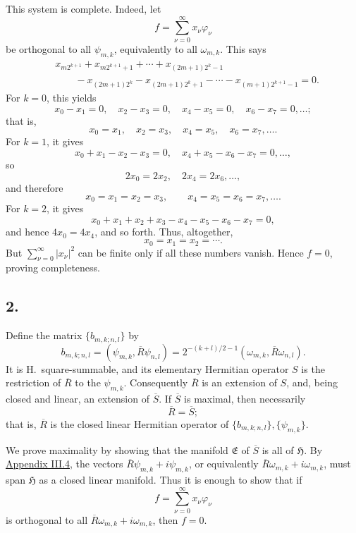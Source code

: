 ﻿\documentclass[paper=b5,fontsize=13pt,bookmarkpackage=false,twoside]{scrartcl}
\begin{document}
This system is complete.  Indeed, let
\[
  f=\sum_{\nu=0}^{\infty}x_\nu\varphi_\nu
\]
be orthogonal to all \(\psi_{m,k}\), equivalently to all
\(\omega_{m,k}\).  This says
\begin{align*}
 &x_{m2^{k+1}}+x_{m2^{k+1}+1}+\cdots
  +x_{(2m+1)2^k-1}\\
 &\qquad
 -x_{(2m+1)2^k}-x_{(2m+1)2^k+1}-\cdots
 -x_{(m+1)2^{k+1}-1}=0.
\end{align*}
For \(k=0\), this yields
\[
  x_0-x_1=0,\quad x_2-x_3=0,\quad
  x_4-x_5=0,\quad x_6-x_7=0,\ldots;
\]
that is,
\[
  x_0=x_1,\quad x_2=x_3,\quad
  x_4=x_5,\quad x_6=x_7,\ldots.
\]
For \(k=1\), it gives
\[
  x_0+x_1-x_2-x_3=0,\quad
  x_4+x_5-x_6-x_7=0,\ldots,
\]
so
\[
  2x_0=2x_2,\quad2x_4=2x_6,\ldots,
\]
and therefore
\[
  x_0=x_1=x_2=x_3,\qquad
  x_4=x_5=x_6=x_7,\ldots.
\]
For \(k=2\), it gives
\[
  x_0+x_1+x_2+x_3-x_4-x_5-x_6-x_7=0,
\]
and hence \(4x_0=4x_4\), and so forth.  Thus, altogether,
\[
  x_0=x_1=x_2=\cdots.
\]
But \(\sum_{\nu=0}^{\infty}|x_\nu|^2\) can be finite only if all these
numbers vanish.  Hence \(f=0\), proving completeness.

\subsection*{2.}
\label{appIV:2}

Define the matrix \(\{b_{m,k;n,l}\}\) by
\[
  b_{m,k;n,l}
  =(\psi_{m,k},\overline R\psi_{n,l})
  =2^{-(k+l)/2-1}(\omega_{m,k},\overline R\omega_{n,l}).
\]
It is H.\ square-summable, and its elementary Hermitian operator \(S\)
is the restriction of \(\overline R\) to the \(\psi_{m,k}\).
Consequently \(\overline R\) is an extension of \(S\), and, being
closed and linear, an extension of \(\overline S\).  If \(\overline S\)
is maximal, then necessarily
\[
  \overline R=\overline S;
\]
that is, \(\overline R\) is the closed linear Hermitian operator of
\(\{b_{m,k;n,l}\},\{\psi_{m,k}\}\).

We prove maximality by showing that the manifold \(\mathfrak E\) of
\(\overline S\) is all of \(\mathfrak H\).  By
\hyperref[appIII:4]{Appendix III.4}, the vectors
\(\overline R\psi_{m,k}+i\psi_{m,k}\), or equivalently
\(\overline R\omega_{m,k}+i\omega_{m,k}\), must span
\(\mathfrak H\) as a closed linear manifold.  Thus it is enough to
show that if
\[
  f=\sum_{\nu=0}^{\infty}x_\nu\varphi_\nu
\]
is orthogonal to all \(\overline R\omega_{m,k}+i\omega_{m,k}\), then
\(f=0\).
\end{document}
